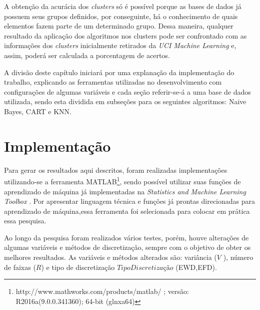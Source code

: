A obtenção da acurácia dos \textit{clusters} só é possível porque as bases de dados já possuem seus grupos definidos, por conseguinte, há o conhecimento de quais elementos fazem parte de um determinado grupo. Dessa maneira, qualquer resultado da aplicação dos algoritmos nos clusters pode ser confrontado com as informações dos \textit{clusters} inicialmente retirados da \textit{UCI Machine Learning} e, assim, poderá ser calculada a porcentagem de acertos.


A divisão deste capítulo iniciará por uma explanação da implementação do trabalho, explicando as ferramentas utilizadas no desenvolvimento com configurações de algumas variáveis e cada seção referir-se-á a uma base de dados utilizada, sendo esta dividida em subseções para os seguintes algoritmos: Naive Bayes, CART e KNN. 

\section{Implementação}\label{cap:resultados:sec:implement}





Para gerar os resultados aqui descritos, foram realizadas implementações utilizando-se a ferramenta MATLAB\footnote{http://www.mathworks.com/products/matlab/ ; versão: R2016a(9.0.0.341360); 64-bit (glnxa64)}, sendo possível utilizar suas funções de aprendizado de máquina já implementadas na \textit{Statistics and Machine Learning Toolbox} . Por apresentar linguagem técnica e funções já prontas direcionadas para aprendizado de máquina,essa ferramenta foi selecionada para colocar em prática essa pesquisa. 


Ao longo da pesquisa foram realizados vários testes, porém, houve alterações de algumas variáveis e métodos de discretização, sempre com o objetivo de obter os melhores resultados. As variáveis e métodos alterados são: variância (${V}$ ), número de faixas (${R}$) e tipo de discretização ${TipoDiscretização}$ (EWD,EFD). 





